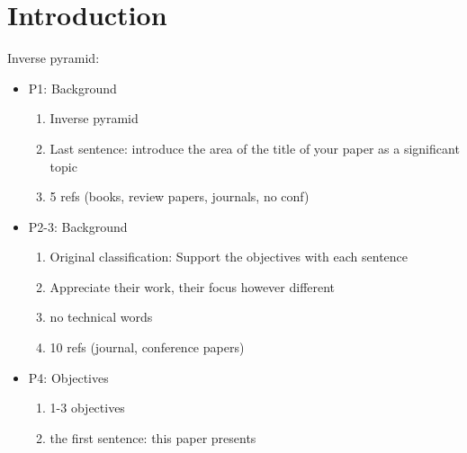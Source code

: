 \section{Introduction}
\label{sec:intro}
    Inverse pyramid:
    \begin{itemize}
        \item P1: Background
        \begin{enumerate}
          \item Inverse pyramid
          \item Last sentence: introduce the area of the title of your paper as a significant topic
          \item 5 refs (books, review papers, journals, no conf)
        \end{enumerate}
        \item P2-3: Background
        \begin{enumerate}
          \item Original classification: Support the objectives with each sentence
          \item Appreciate their work, their focus however different
          \item no technical words
          \item 10 refs (journal, conference papers)
        \end{enumerate}
        \item P4: Objectives
        \begin{enumerate}
          \item 1-3 objectives
          \item the first sentence: this paper presents
        \end{enumerate}
    \end{itemize}

